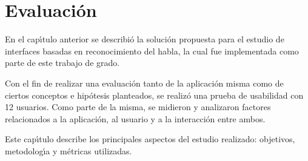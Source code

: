 \chapter{Evaluaci\'on}
\label{sec:evaluacion}


En el cap{\'\i}tulo anterior se describi\'o la soluci\'on propuesta para el estudio de interfaces basadas en
reconocimiento del habla, la cual fue implementada como parte de este trabajo de grado.

Con el fin de realizar una evaluaci\'on tanto de la aplicaci\'on misma como de ciertos conceptos 
e hip\'otesis planteados, se realiz\'o una prueba de usabilidad con 12 usuarios. 
Como parte de la misma, se midieron y analizaron factores relacionados a la aplicaci\'on,
al usuario y a la interacci\'on entre ambos.

Este cap{\'\i}tulo describe los principales aspectos del estudio realizado: objetivos, metodolog{\'\i}a
y m\'etricas utilizadas.




